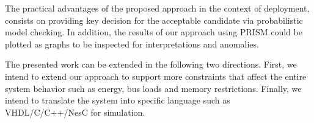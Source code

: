 \documentclass[3p,times,procedia,authoryear,round]{elsarticle}
\begin{document}
The practical advantages of the proposed approach in the context of deployment, consists on providing key decision for the acceptable candidate via probabilistic model checking. In addition, the results of our approach using PRISM could be plotted as graphs to be inspected for interpretations and anomalies. 

The presented work can be extended in the following two directions. First, we intend to extend our approach to support more constraints that affect the entire system behavior such as energy, bus loads and memory restrictions. Finally, we intend to translate the system into specific language such as VHDL/C/C++/NesC for simulation. 











\end{document}
